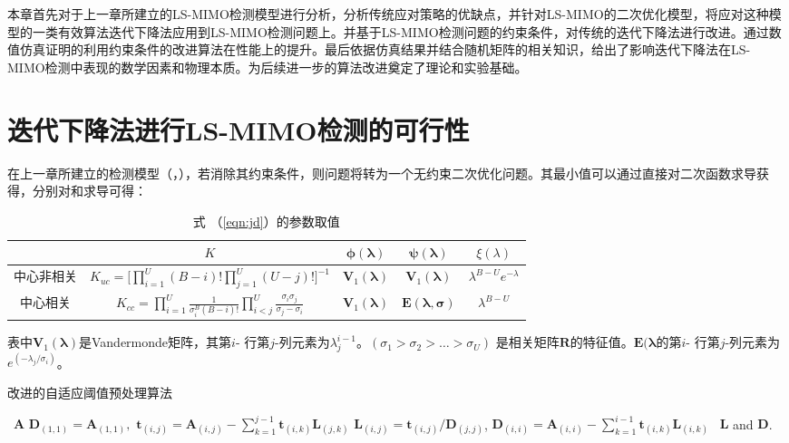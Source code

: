 \documentclass[bachelor,oneside]{seuthesis} %
\begin{document}
\begin{spacing}{1.5}
\begin{Main}
本章首先对于上一章所建立的LS-MIMO检测模型进行分析，分析传统应对策略的优缺点，并针对LS-MIMO的二次优化模型，将应对这种模型的一类有效算法迭代下降法应用到LS-MIMO检测问题上。并基于LS-MIMO检测问题的约束条件，对传统的迭代下降法进行改进。通过数值仿真证明的利用约束条件的改进算法在性能上的提升。最后依据仿真结果并结合随机矩阵的相关知识，给出了影响迭代下降法在LS-MIMO检测中表现的数学因素和物理本质。为后续进一步的算法改进奠定了理论和实验基础。
\section{迭代下降法进行LS-MIMO检测的可行性}
在上一章所建立的检测模型（，），若消除其约束条件，则问题将转为一个无约束二次优化问题。其最小值可以通过直接对二次函数求导获得，分别对和求导可得：

\begin{table}[htbp]\centering
\caption{式 （\ref{eqn:jd}）的参数取值 }\label{tab:1}
\begin{tabular}{|c|c|c|c|c|}
  \hline
 &$K$ &$\mathbf {\phi}({\mathbf \lambda})$ &$\mathbf {\psi}({\mathbf \lambda})$& $\xi(\lambda)$ \\
 \hline
  中心非相关& $K_{uc}=\big[\prod_{i=1}^U(B-i)!\prod_{j=1}^U(U-j)!\big]^{-1}$&
   $\mathbf{V}_1(\mathbf{\lambda})$& $\mathbf{V}_1(\mathbf{\lambda})$ &$ \lambda^{B-U}e^{-\lambda}$ \\
   \hline
  中心相关&$K_{cc}=\prod_{i=1}^{U}\frac{1}{\sigma_i^B(B-i)!}\prod_{i<j}^U\frac{\sigma_i\sigma_j}{\sigma_j-\sigma_i}$&
  $\mathbf{V}_1(\mathbf{\lambda})$  & $\mathbf{E}(\mathbf{\lambda}, \mathbf{\sigma})$&$\lambda^{B-U}$\\
  \hline
\end{tabular}
\end{table}

表中$\mathbf{V}_1(\mathbf{\lambda})$是Vandermonde矩阵\cite{horn2012matrix}，其第$i$- 行第$j$-列元素为$\lambda_j^{i-1}$。$(\sigma_1>\sigma_2>\ldots>\sigma_U)$ 是相关矩阵$\mathbf{R}$的特征值。$\mathbf{E}(\mathbf{\lambda}$的第$i$- 行第$j$-列元素为$e^{(-\lambda_j/\sigma_i)}$。



\begin{algorithm}[htbp]
\caption{改进的自适应阈值预处理算法}
\begin{algorithmic}[1]
\REQUIRE~$\mathbf A$
\STATE ${\mathbf D_{(1,1)} }=\mathbf{A}_{(1, 1)},$
\label{alg:d1}
\STATE $\mathbf{t}_{(i,j)}= {\mathbf{A}_{(i,j)}} -\sum_{k=1}^{j-1}{\mathbf {t}_{(i,k)}\mathbf{L}_{(j,k)}}$\label{alg:mac1}
\STATE $\mathbf{L}_{(i,j)}= {\mathbf t_{(i,j)}}/{\mathbf D_{(j,j)}}$,\label{alg:sc}
\ENDFOR
\STATE $\mathbf{D}_{(i,i)}={\mathbf A_{(i,i)}} -\sum_{k=1}^{i-1}{\mathbf{t}_{(i,k)}\mathbf{L}_{(i,k)}}$\label{alg:mac2}
\ENDFOR
\ENSURE ~$\mathbf{L}$ and $\mathbf{D}$.
\end{algorithmic}\label{alg:ldl}
\end{algorithm}




\end{Main}
\end{spacing}
\end{document}
